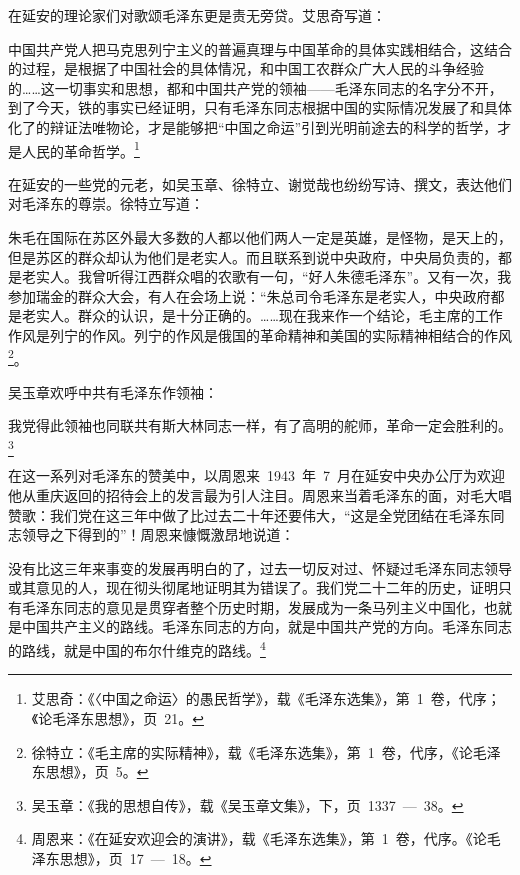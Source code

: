 在延安的理论家们对歌颂毛泽东更是责无旁贷。艾思奇写道：

\begin{quoting}
中国共产党人把马克思列宁主义的普遍真理与中国革命的具体实践相结合，这结合的过程，是根据了中国社会的具体情况，和中国工农群众广大人民的斗争经验的……这一切事实和思想，都和中国共产党的领袖——毛泽东同志的名字分不开，到了今天，铁的事实已经证明，只有毛泽东同志根据中国的实际情况发展了和具体化了的辩证法唯物论，才是能够把“中国之命运”引到光明前途去的科学的哲学，才是人民的革命哲学。\footnote{艾思奇：《〈中国之命运〉的愚民哲学》，载《毛泽东选集》，第~1~卷，代序；《论毛泽东思想》，页~21。}
\end{quoting}

在延安的一些党的元老，如吴玉章、徐特立、谢觉哉也纷纷写诗、撰文，表达他们对毛泽东的尊崇。徐特立写道：

\begin{quoting}
朱毛在国际在苏区外最大多数的人都以他们两人一定是英雄，是怪物，是天上的，但是苏区的群众却认为他们是老实人。而且联系到说中央政府，中央局负责的，都是老实人。我曾听得江西群众唱的农歌有一句，“好人朱德毛泽东”。又有一次，我参加瑞金的群众大会，有人在会场上说：“朱总司令毛泽东是老实人，中央政府都是老实人。群众的认识，是十分正确的。……现在我来作一个结论，毛主席的工作作风是列宁的作风。列宁的作风是俄国的革命精神和美国的实际精神相结合的作风\footnote{徐特立：《毛主席的实际精神》，载《毛泽东选集》，第~1~卷，代序，《论毛泽东思想》，页~5。}。
\end{quoting}

吴玉章欢呼中共有毛泽东作领袖：

\begin{quoting}
我党得此领袖也同联共有斯大林同志一样，有了高明的舵师，革命一定会胜利的。\footnote{吴玉章：《我的思想自传》，载《吴玉章文集》，下，页~1337~—~38。}
\end{quoting}

在这一系列对毛泽东的赞美中，以周恩来~1943~年~7~月在延安中央办公厅为欢迎他从重庆返回的招待会上的发言最为引人注目。周恩来当着毛泽东的面，对毛大唱赞歌：我们党在这三年中做了比过去二十年还要伟大，“这是全党团结在毛泽东同志领导之下得到的”！周恩来慷慨激昂地说道：

\begin{quoting}
没有比这三年来事变的发展再明白的了，过去一切反对过、怀疑过毛泽东同志领导或其意见的人，现在彻头彻尾地证明其为错误了。我们党二十二年的历史，证明只有毛泽东同志的意见是贯穿者整个历史时期，发展成为一条马列主义中国化，也就是中国共产主义的路线。毛泽东同志的方向，就是中国共产党的方向。毛泽东同志的路线，就是中国的布尔什维克的路线。\footnote{周恩来：《在延安欢迎会的演讲》，载《毛泽东选集》，第~1~卷，代序。《论毛泽东思想》，页~17~—~18。}
\end{quoting}

